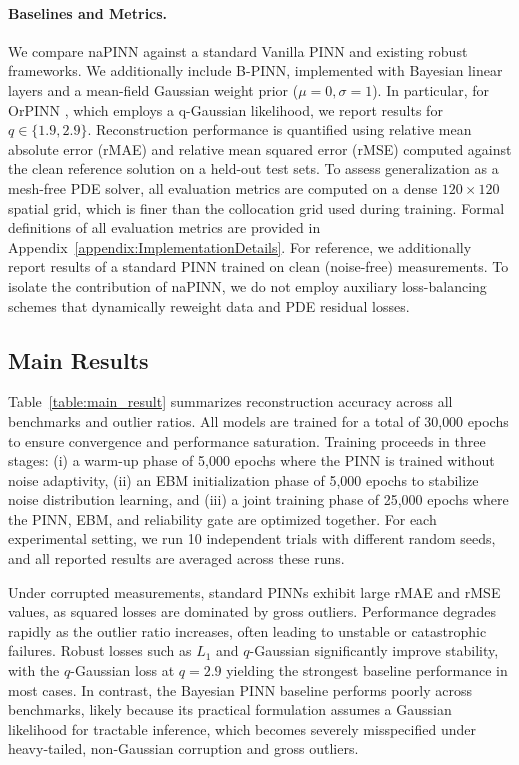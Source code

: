 \documentclass{article}
\theoremstyle{plain}
\theoremstyle{definition}
\theoremstyle{remark}
\begin{document}
\paragraph{Baselines and Metrics.} We compare naPINN against a standard Vanilla PINN and existing robust frameworks. We additionally include B-PINN, implemented with Bayesian linear layers and a mean-field Gaussian weight prior ($\mu=0, \sigma=1$). In particular, for OrPINN \cite{Duarte2025}, which employs a q-Gaussian likelihood, we report results for $q \in \{1.9, 2.9\}$. Reconstruction performance is quantified using relative mean absolute error (rMAE) and relative mean squared error (rMSE) computed against the clean reference solution on a held-out test sets. To assess generalization as a mesh-free PDE solver, all evaluation metrics are computed on a dense $120 \times 120$ spatial grid, which is finer than the collocation grid used during training. Formal definitions of all evaluation metrics are provided in Appendix~\ref{appendix:ImplementationDetails}. For reference, we additionally report results of a standard PINN trained on clean (noise-free) measurements. To isolate the contribution of naPINN, we do not employ auxiliary loss-balancing schemes that dynamically reweight data and PDE residual losses.

\subsection{Main Results}

Table~\ref{table:main_result} summarizes reconstruction accuracy across all benchmarks and outlier ratios. All models are trained for a total of 30{,}000 epochs to ensure convergence and performance saturation. Training proceeds in three stages: (i) a warm-up phase of 5{,}000 epochs where the PINN is trained without noise adaptivity, (ii) an EBM initialization phase of 5{,}000 epochs to stabilize noise distribution learning, and (iii) a joint training phase of 25{,}000 epochs where the PINN, EBM, and reliability gate are optimized together. For each experimental setting, we run 10 independent trials with different random seeds, and all reported results are averaged across these runs.

Under corrupted measurements, standard PINNs exhibit large rMAE and rMSE values, as squared losses are dominated by gross outliers. Performance degrades rapidly as the outlier ratio increases, often leading to unstable or catastrophic failures. Robust losses such as $L_1$ and $q$-Gaussian significantly improve stability, with the $q$-Gaussian loss at $q=2.9$ yielding the strongest baseline performance in most cases. In contrast, the Bayesian PINN baseline performs poorly across benchmarks, likely because its practical formulation assumes a Gaussian likelihood for tractable inference, which becomes severely misspecified under heavy-tailed, non-Gaussian corruption and gross outliers.
\end{document}
